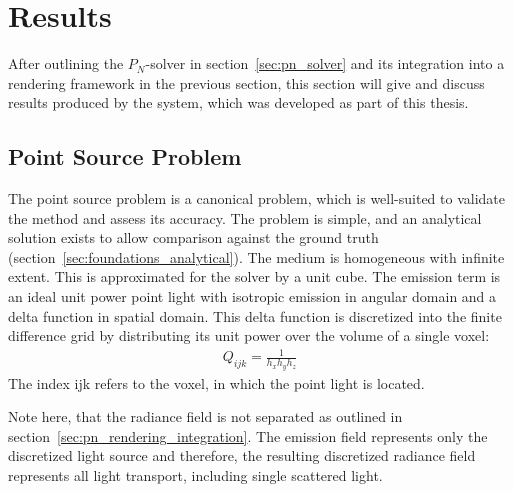 \section{Results}
\label{sec:pn_results}

After outlining the $P_N$-solver in section~\ref{sec:pn_solver} and its integration into a rendering framework in the previous section, this section will give and discuss results produced by the system, which was developed as part of this thesis.

\subsection{Point Source Problem}
\label{sec:pn_results_pointsource}

The point source problem is a canonical problem, which is well-suited to validate the method and assess its accuracy. The problem is simple, and an analytical solution exists to allow comparison against the ground truth (section~\ref{sec:foundations_analytical}). The medium is homogeneous with infinite extent. This is approximated for the solver by a unit cube. The emission term is an ideal unit power point light with isotropic emission in angular domain and a delta function in spatial domain. This delta function is discretized into the finite difference grid by distributing its unit power over the volume of a single voxel:
\begin{align}
Q_{ijk} = \frac{1}{h_xh_yh_z}
\end{align}
The index {ijk} refers to the voxel, in which the point light is located.

Note here, that the radiance field is not separated as outlined in section~\ref{sec:pn_rendering_integration}. The emission field represents only the discretized light source and therefore, the resulting discretized radiance field represents all light transport, including single scattered light.

